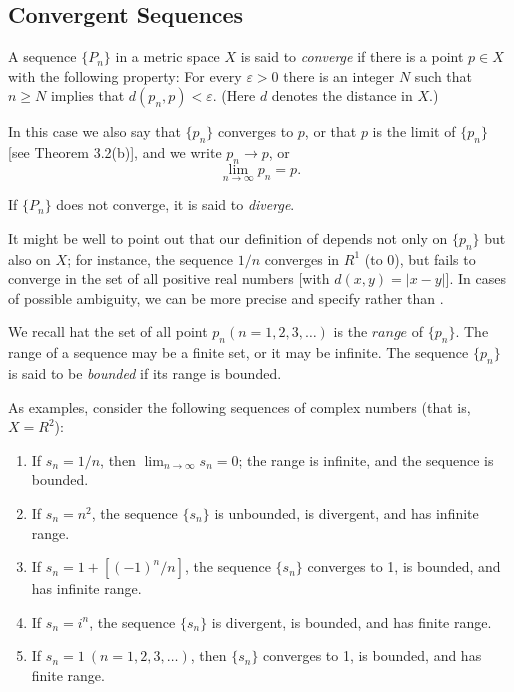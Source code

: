 \documentclass[../poma-notes.tex]{subfiles}
\begin{document}
\subsection*{Convergent Sequences}

\begin{definition}
  A sequence $\{P_n\}$ in a metric space $X$ is said to \textit{converge} if there is a point $p \in X$ with the
  following property: For every $\varepsilon > 0$ there is an integer $N$ such that $n \ge N$ implies that
  $d(p_n,p) < \varepsilon$. (Here $d$ denotes the distance in $X$.)

  In this case we also say that $\{p_n\}$ converges to $p$, or that $p$ is the limit of $\{p_n\}$
  [see Theorem 3.2(b)], and we write $p_n \to p$, or
  \[\lim_{n \to \infty} p_n = p.\]

  If $\{P_n\}$ does not converge, it is said to \textit{diverge}.

  It might be well to point out that our definition of  depends not only on $\{p_n\}$
  but also on $X$; for instance, the sequence ${1/n}$ converges in $R^1$ (to $0$), but fails to converge in the set
  of all positive real numbers [with $d(x,y)=|x-y|$]. In cases of possible ambiguity, we can be more precise and
  specify  rather than .

  We recall hat the set of all point $p_n (n=1,2,3,\dots)$ is the $\textit{range}$ of $\{p_n\}$. The range of a
  sequence may be a finite set, or it may be infinite. The sequence $\{p_n\}$ is said to be \textit{bounded} if
  its range is bounded.

  As examples, consider the following sequences of complex numbers (that is, $X = R^2$):
  \begin{enumerate}[label=(\alph*)]
    \item If $s_n = 1/n$, then $\lim_{n \to \infty} s_n = 0$; the range is infinite, and the sequence is bounded.
    \item If $s_n = n^2$, the sequence $\{s_n\}$ is unbounded, is divergent, and has infinite range.
    \item If $s_n = 1 + [(-1)^n/n]$, the sequence $\{s_n\}$ converges to 1, is bounded, and has infinite range.
    \item If $s_n = i^n$, the sequence $\{s_n\}$ is divergent, is bounded, and has finite range.
    \item If $s_n = 1\ (n=1,2,3,\dots)$, then $\{s_n\}$ converges to 1, is bounded, and has finite range.
  \end{enumerate}
\end{definition}
\end{document}
